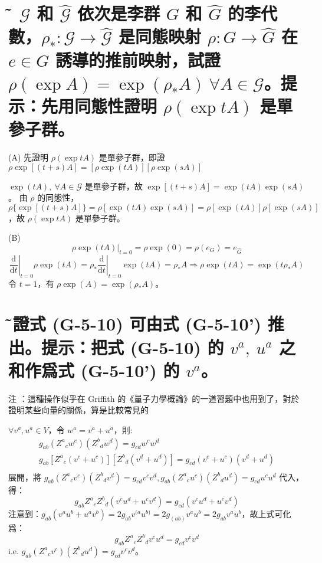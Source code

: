 \documentclass{article}
\begin{document}
\section{\~ 設 $\mathscr{G}$ 和 $\hat{\mathscr{G}}$ 依次是李群 $G$ 和 $\hat{G}$ 的李代數，$\rho_*:\mathscr{G}\to\hat{\mathscr{G}}$ 是同態映射 $\rho:G\to \hat G$ 在 $e\in G$ 誘導的推前映射，試證 $\rho(\exp A)=\exp(\rho_*A)\ \forall A\in\mathscr{G}$。提示：先用同態性證明 $\rho(\exp tA)$ 是單參子群。}
\begin{framed}
  (A) 先證明 $\rho(\exp tA)$ 是單參子群，即證 $\rho\exp[(t+s)A]=[\rho\exp(tA)][\rho\exp(sA)]$

  $\exp(tA),\ \forall A\in\mathscr{G}$ 是單參子群，故 $\exp[(t+s)A]=\exp(tA)\exp(sA)$。
  由 $\rho$ 的同態性，$\rho\{\exp[(t+s)A]\}=\rho[\exp(tA)\exp(sA)]=\rho[\exp(tA)]\rho[\exp(sA)]$，故 $\rho(\exp tA)$ 是單參子群。

  (B)
  $$\rho\exp(tA)|_{t=0}=\rho\exp(0)=\rho(e_G)=e_{\hat{G}}$$
  $$\left.\frac{\mathrm{d}}{\mathrm{d}t}\right|_{t=0}\rho\exp(tA)=\rho_*\left.\frac{\mathrm{d}}{\mathrm{d}t}\right|_{t=0}\exp(tA)=\rho_*A\Rightarrow\rho\exp(tA)=\exp(t\rho_*A)$$
  令 $t=1$，有 $\rho\exp(A)=\exp(\rho_*A)$。
\end{framed}

\section{\~ 試證式 (G-5-10) 可由式 (G-5-10') 推出。提示：把式 (G-5-10) 的 $v^a,\ u^a$ 之和作爲式 (G-5-10') 的 $v^a$。}
\begin{framed}
  注 ：這種操作似乎在 Griffith 的《量子力學概論》的一道習題中也用到了，對於證明某些向量的關係，算是比較常見的~

  $\forall v^a,u^a\in V$，令 $w^a=v^a+u^a$，則:
  $$\begin{gathered}
      {g_{ab}}\left( {{Z^a}_c{w^c}} \right)\left( {{Z^b}_d{w^d}} \right) = {g_{cd}}{w^c}{w^d} \\
      {g_{ab}}\left[ {{Z^a}_c\left( {{v^c} + {u^c}} \right)} \right]\left[ {{Z^b}_d\left( {{v^d} + {u^d}} \right)} \right] = {g_{cd}}\left( {{v^c} + {u^c}} \right)\left( {{v^d} + {u^d}} \right) \\
    \end{gathered}$$
  展開，將 ${g_{ab}}\left( {{Z^a}_c{v^c}} \right)\left( {{Z^b}_d{v^d}} \right) = {g_{cd}}{v^c}{v^d},{g_{ab}}\left( {{Z^a}_c{u^c}} \right)\left( {{Z^b}_d{u^d}} \right) = {g_{cd}}{u^c}{u^d}$ 代入，得：
  $${g_{ab}}{Z^a}_c{Z^b}_d\left( {{v^c}{u^d} + {u^c}{v^d}} \right) = {g_{cd}}\left( {{v^c}{u^d} + {u^c}{v^d}} \right)$$
  注意到：${g_{ab}}\left( {{v^a}{u^b} + {u^a}{v^b}} \right) = 2{g_{ab}}{v^{(a}}{u^{b)}} = 2{g_{\left( {ab} \right)}}{v^a}{u^b} = 2{g_{ab}}{v^a}{u^b}$，故上式可化爲：
  $${g_{ab}}{Z^a}_c{Z^b}_d{v^c}{u^d} = {g_{cd}}{v^c}{v^d}$$
  i.e. ${g_{ab}}\left( {{Z^a}_c{v^c}} \right)\left( {{Z^b}_d{u^d}} \right) = {g_{cd}}{v^c}{v^d}$。
\end{framed}
\end{document}
